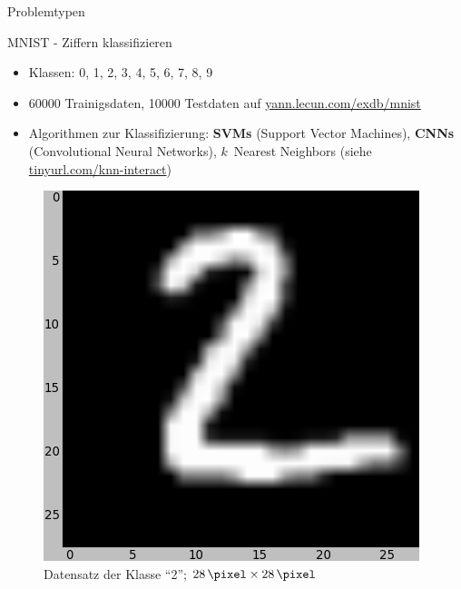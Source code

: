 \begin{frame}{Problemtypen}
\begin{minipage}[b]{0.45\linewidth}
\begin{figure}
            \caption{}
            \label{fig:Klassifikation}
            \end{figure}
        \end{minipage}
\end{frame}


\begin{frame}{MNIST - Ziffern klassifizieren}
    \begin{minipage}[b]{0.45\linewidth}
        \begin{itemize}
            \item Klassen: 0, 1, 2, 3, 4, 5, 6, 7, 8, 9
            \item \num{60000} Trainigsdaten, \num{10000} Testdaten
                  auf \href{http://yann.lecun.com/exdb/mnist/}{yann.lecun.com/exdb/mnist}
            \item Algorithmen zur Klassifizierung: \textbf{SVMs} (Support Vector Machines),
                  \textbf{CNNs} (Convolutional Neural Networks),
                  $k$~Nearest Neighbors (siehe \href{http://martin-thoma.com/k-nearest-neighbor-classification-interactive-example/}{tinyurl.com/knn-interact})
        \end{itemize}
    \end{minipage}
    \hspace{0.5cm}
    \begin{minipage}[b]{0.45\linewidth}
        \begin{figure}
            \centering
            \includegraphics[width=\textwidth]{../images/mnist-2.png}
            \caption{Datensatz der Klasse \enquote{2}; $\SI{28}{\pixel} \times \SI{28}{\pixel}$}
            \label{fig:spline}
        \end{figure}
    \end{minipage}
\end{frame}

